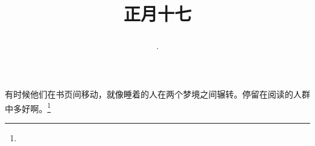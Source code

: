 \title{\date[d=26,m=2,y=2024][year:cn-y,年,month:cn,day:cn,日,·,weekday]·正月十七 }
有时候他们在书页间移动，就像睡着的人在两个梦境之间辗转。停留在阅读的人群中多好啊。\footnote{ }

